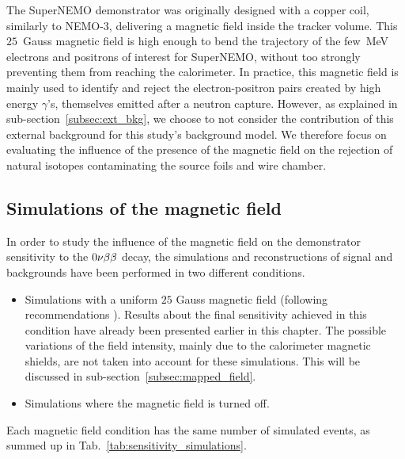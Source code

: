 The SuperNEMO demonstrator was originally designed with a copper coil, similarly to NEMO-$3$, delivering a magnetic field inside the tracker volume.
This $25$~Gauss magnetic field is high enough to bend the trajectory of the few~MeV electrons and positrons of interest for SuperNEMO, without too strongly preventing them from reaching the calorimeter.
In practice, this magnetic field is mainly used to identify and reject the electron-positron pairs created by high energy $\gamma$’s, themselves emitted after a neutron capture.
However, as explained in sub-section~\ref{subsec:ext_bkg}, we choose to not consider the contribution of this external background for this study's background model.
We therefore focus on evaluating the influence of the presence of the magnetic field on the rejection of natural isotopes contaminating the source foils and wire chamber.





\subsection{Simulations of the magnetic field}

In order to study the influence of the magnetic field on the demonstrator sensitivity to the $0\nu\beta\beta$ decay, the simulations and reconstructions of signal and backgrounds have been performed in two different conditions.
\begin{itemize}
\item Simulations with a uniform $25$ Gauss magnetic field (following recommendations \cite{CalvezThesis}).
  Results about the final sensitivity achieved in this condition have already been presented earlier in this chapter.
  The possible variations of the field intensity, mainly due to the calorimeter magnetic shields, are not taken into account for these simulations.
  This will be discussed in sub-section~\ref{subsec:mapped_field}.
\item Simulations where the magnetic field is turned off.
\end{itemize}
Each magnetic field condition has the same number of simulated events, as summed up in Tab.~\ref{tab:sensitivity_simulations}.

